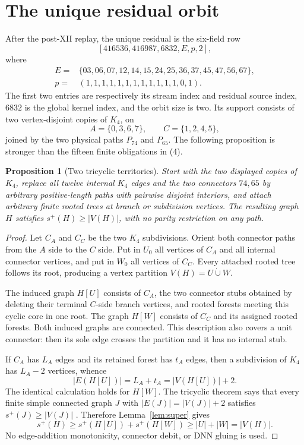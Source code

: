 \documentclass[11pt]{article}
\newtheorem{proposition}[theorem]{Proposition}
\theoremstyle{remark}
\newcommand{\splus}{s^+}
\begin{document}
\section{The unique residual orbit}

After the post-XII replay, the unique residual is the six-field row
\[
 [416536,416987,6832,E,p,2],                                  \tag{9}
\]
where
\begin{align*}
 E={}&\{03,06,07,12,14,15,24,25,36,37,45,47,56,67\},\\
 p={}&(1,1,1,1,1,1,1,1,1,1,1,1,0,1).
\end{align*}
The first two entries are respectively its stream index and residual source
index, $6832$ is the global kernel index, and the orbit size is two.  Its
support consists of two vertex-disjoint copies of $K_4$, on
\[
 A=\{0,3,6,7\},\qquad C=\{1,2,4,5\},
\]
joined by the two physical paths $P_{74}$ and $P_{65}$.  The following
proposition is stronger than the fifteen finite obligations in (4).

\begin{proposition}[Two tricyclic territories]\label{prop:singleton}
Start with the two displayed copies of $K_4$, replace all twelve internal
$K_4$ edges and the two connectors $74,65$ by arbitrary positive-length
paths with pairwise disjoint interiors, and attach arbitrary finite rooted
trees at branch or subdivision vertices.  The resulting graph $H$ satisfies
$\splus(H)\geq|V(H)|$, with no parity restriction on any path.
\end{proposition}

\begin{proof}
Let $C_A$ and $C_C$ be the two $K_4$ subdivisions.  Orient both connector
paths from the $A$ side to the $C$ side.  Put in $U_0$ all vertices of $C_A$
and all internal connector vertices, and put in $W_0$ all vertices of $C_C$.
Every attached rooted tree follows its root, producing a vertex partition
$V(H)=U\mathbin{\dot\cup}W$.

The induced graph $H[U]$ consists of $C_A$, the two connector stubs obtained by
deleting their terminal $C$-side branch vertices, and rooted forests meeting
this cyclic core in one root.  The graph $H[W]$ consists of $C_C$ and its
assigned rooted forests.  Both induced graphs are connected.  This description
also covers a unit connector: then its sole edge crosses the partition and it
has no internal stub.

If $C_A$ has $L_A$ edges and its retained forest has $t_A$ edges, then a
subdivision of $K_4$ has $L_A-2$ vertices, whence
\[
 |E(H[U])|=L_A+t_A=|V(H[U])|+2.
\]
The identical calculation holds for $H[W]$.  The tricyclic theorem says that
every finite simple connected graph $J$ with
$|E(J)|=|V(J)|+2$ satisfies $\splus(J)\geq|V(J)|$
\cite{Tricyclic}.  Therefore Lemma~\ref{lem:super} gives
\[
 \splus(H)\geq\splus(H[U])+\splus(H[W])
 \geq|U|+|W|=|V(H)|.
\]
No edge-addition monotonicity, connector debit, or DNN gluing is used.
\end{proof}
\end{document}
